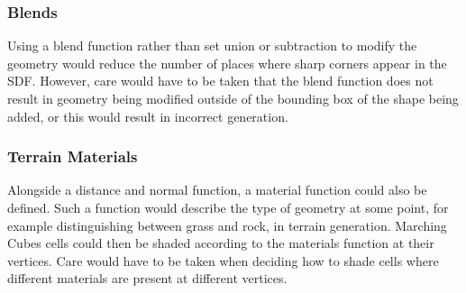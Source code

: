 \documentclass[11pt]{article}
\begin{document}
\subsubsection{Blends}
Using a blend function rather than set union or subtraction to modify the geometry would reduce the number of places where sharp corners appear in the SDF. However, care would have to be taken that the blend function does not result in geometry being modified outside of the bounding box of the shape being added, or this would result in incorrect generation.
\subsubsection{Terrain Materials}
Alongside a distance and normal function, a material function could also be defined. Such a function would describe the type of geometry at some point, for example distinguishing between grass and rock, in terrain generation. Marching Cubes cells could then be shaded according to the materials function at their vertices. Care would have to be taken when deciding how to shade cells where different materials are present at different vertices.


\end{document}
